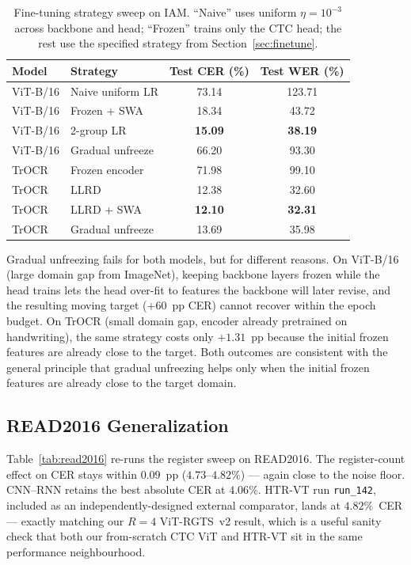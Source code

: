 \begin{table}[t]
\centering
\small
\caption{Fine-tuning strategy sweep on IAM. ``Naive'' uses uniform $\eta = 10^{-3}$ across backbone and head; ``Frozen'' trains only the CTC head; the rest use the specified strategy from Section~\ref{sec:finetune}.}
\label{tab:finetune}
\begin{tabular}{llcc}
\toprule
Model & Strategy & Test CER (\%) & Test WER (\%) \\
\midrule
ViT-B/16 & Naive uniform LR       & 73.14 & 123.71 \\
ViT-B/16 & Frozen + SWA           & 18.34 & 43.72  \\
ViT-B/16 & 2-group LR             & \textbf{15.09} & \textbf{38.19} \\
ViT-B/16 & Gradual unfreeze       & 66.20 & 93.30  \\
TrOCR    & Frozen encoder         & 71.98 & 99.10  \\
TrOCR    & LLRD                   & 12.38 & 32.60  \\
TrOCR    & LLRD + SWA             & \textbf{12.10} & \textbf{32.31} \\
TrOCR    & Gradual unfreeze       & 13.69 & 35.98  \\
\bottomrule
\end{tabular}
\end{table}

Gradual unfreezing fails for both models, but for different reasons. On ViT-B/16 (large domain gap from ImageNet), keeping backbone layers frozen while the head trains lets the head over-fit to features the backbone will later revise, and the resulting moving target ($+60$~pp CER) cannot recover within the epoch budget. On TrOCR (small domain gap, encoder already pretrained on handwriting), the same strategy costs only $+1.31$~pp because the initial frozen features are already close to the target. Both outcomes are consistent with the general principle that gradual unfreezing helps only when the initial frozen features are already close to the target domain.

\subsection{READ2016 Generalization}
\label{sec:res_read2016}

Table~\ref{tab:read2016} re-runs the register sweep on READ2016. The register-count effect on CER stays within $0.09$~pp ($4.73$--$4.82\%$) --- again close to the noise floor. CNN--RNN retains the best absolute CER at $4.06\%$. HTR-VT run \texttt{run\_142}, included as an independently-designed external comparator, lands at $4.82\%$~CER --- exactly matching our $R = 4$ ViT-RGTS~v2 result, which is a useful sanity check that both our from-scratch CTC ViT and HTR-VT sit in the same performance neighbourhood.

